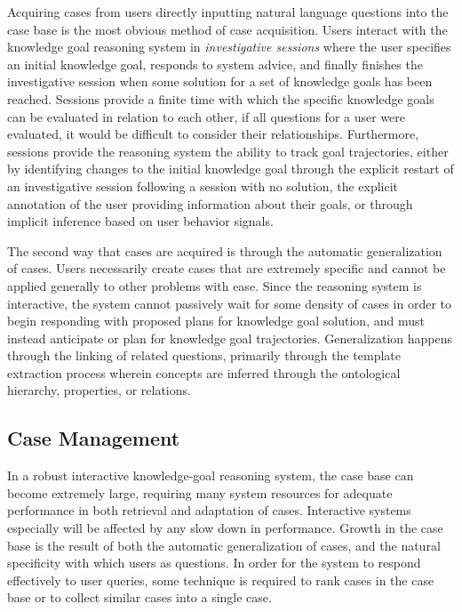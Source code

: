 \documentclass{llncs}
\begin{document}
Acquiring cases from users directly inputting natural language questions into the case base is the most obvious method of case acquisition. Users interact with the knowledge goal reasoning system in \textit{investigative sessions} where the user specifies an initial knowledge goal, responds to system advice, and finally finishes the investigative session when some solution for a set of knowledge goals has been reached. Sessions provide a finite time with which the specific knowledge goals can be evaluated in relation to each other, if all questions for a user were evaluated, it would be difficult to consider their relationships. Furthermore, sessions provide the reasoning system the ability to track goal trajectories, either by identifying changes to the initial knowledge goal through the explicit restart of an investigative session following a session with no solution, the explicit annotation of the user providing information about their goals, or through implicit inference based on user behavior signals.

The second way that cases are acquired is through the automatic generalization of cases. Users necessarily create cases that are extremely specific and cannot be applied generally to other problems with ease. Since the reasoning system is interactive, the system cannot passively wait for some density of cases in order to begin responding with proposed plans for knowledge goal solution, and must instead anticipate or plan for knowledge goal trajectories. Generalization happens through the linking of related questions, primarily through the template extraction process wherein concepts are inferred through the ontological hierarchy, properties, or relations.

\subsection{Case Management}

In a robust interactive knowledge-goal reasoning system, the case base can become extremely large, requiring many system resources for adequate performance in both retrieval and adaptation of cases. Interactive systems especially will be affected by any slow down in performance. Growth in the case base is the result of both the automatic generalization of cases, and the natural specificity with which users as questions. In order for the system to respond effectively to user queries, some technique is required to rank cases in the case base or to collect similar cases into a single case.
\end{document}
